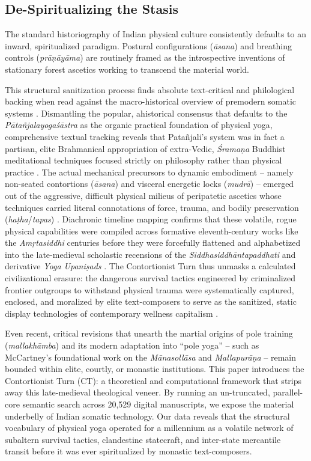 \documentclass[11pt,twoside,letterpaper]{article}
\begin{document}
\subsection{De-Spiritualizing the Stasis}
The standard historiography of Indian physical culture consistently defaults to an inward, spiritualized paradigm. Postural configurations (\textit{\={a}sana}) and breathing controls (\textit{pr\={a}\d{n}\={a}y\={a}ma}) are routinely framed as the introspective inventions of stationary forest ascetics working to transcend the material world.

This structural sanitization process finds absolute text-critical and philological backing when read against the macro-historical overview of premodern somatic systems \citep{Mallinson2017}. Dismantling the popular, ahistorical consensus that defaults to the \textit{P\={a}ta\~{n}jalayoga\'s\={a}stra} as the organic practical foundation of physical yoga, comprehensive textual tracking reveals that Pata\~{n}jali’s system was in fact a partisan, elite Brahmanical appropriation of extra-Vedic, \textit{\'{S}rama\d{n}a} Buddhist meditational techniques focused strictly on philosophy rather than physical practice \citep{Mallinson2017}. The actual mechanical precursors to dynamic embodiment – namely non-seated contortions (\textit{\={a}sana}) and visceral energetic locks (\textit{mudr\={a}}) – emerged out of the aggressive, difficult physical milieus of peripatetic ascetics whose techniques carried literal connotations of force, trauma, and bodily preservation (\textit{ha\d{t}ha}/\textit{tapas}) \citep{Mallinson2017}. Diachronic timeline mapping confirms that these volatile, rogue physical capabilities were compiled across formative eleventh-century works like the \textit{Am\d{r}tasiddhi} centuries before they were forcefully flattened and alphabetized into the late-medieval scholastic recensions of the \textit{Siddhasiddh\={a}ntapaddhati} and derivative \textit{Yoga Upani\d{s}ads} \citep{Birch2024, Mallinson2017}. The Contortionist Turn thus unmasks a calculated civilizational erasure: the dangerous survival tactics engineered by criminalized frontier outgroups to withstand physical trauma were systematically captured, enclosed, and moralized by elite text-composers to serve as the sanitized, static display technologies of contemporary wellness capitalism \citep{Debnath2024, Mallinson2017, McCartney2021}.

Even recent, critical revisions that unearth the martial origins of pole training (\textit{mallakh\={a}mba}) and its modern adaptation into “pole yoga” – such as McCartney’s foundational work on the \textit{M\={a}nasoll\={a}sa} and \textit{Mallapur\={a}\d{n}a} – remain bounded within elite, courtly, or monastic institutions. This paper introduces the Contortionist Turn (CT): a theoretical and computational framework that strips away this late-medieval theological veneer. By running an un-truncated, parallel-core semantic search across 20,529 digital manuscripts, we expose the material underbelly of Indian somatic technology. Our data reveals that the structural vocabulary of physical yoga operated for a millennium as a volatile network of subaltern survival tactics, clandestine statecraft, and inter-state mercantile transit before it was ever spiritualized by monastic text-composers.
\end{document}
